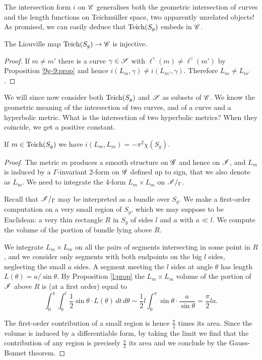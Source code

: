 The intersection form $i$ on $\mathscr{C}$ generalises both the geometric intersection of curves and the length functions on Teichm\"uller space, two apparently unrelated objects! As promised, we can easily deduce that ${\rm Teich}(S_g)$ embeds in $\mathscr{C}$.

\begin{cor}
The Liouville map ${\rm Teich}(S_g) \to \mathscr{C}$ is injective.
\end{cor}
\begin{proof}
If $m\neq m'$ there is a curve $\gamma\in\mathscr{S}$ with $\ell^\gamma(m) \neq \ell^\gamma(m')$ by Proposition \ref{9g-9:prop} and hence $i(L_m,\gamma) \neq i(L_{m'},\gamma)$. Therefore $L_m \neq L_{m'}$.
\end{proof}

We will since now consider both ${\rm Teich}(S_g)$ and $\mathscr{S}$ as subsets of $\mathscr{C}$.
We know the geometric meaning of the intersection of two curves, and of a curve and a hyperbolic metric. What is the intersection of two hyperbolic metrics? When they coincide, we get a positive constant.

\begin{prop}
If $m \in {\rm Teich}(S_g)$ we have $i(L_m, L_m) = -\pi^2 \chi(S_g)$.
\end{prop}
\begin{proof}
The metric $m$ produces a smooth structure on $\mathscr{G}$ and hence on $\mathscr{I}$, and $L_m$ is induced by a $\Gamma$-invariant 2-form on $\mathscr{G}$ defined up to sign, that we also denote as $L_m$. We need to integrate the 4-form $L_m \times L_m$ on $\mathscr{I}/_\Gamma$.

Recall that $\mathscr{I}/_\Gamma$ may be interpreted as a bundle over $S_g$.
We make a first-order computation on a very small region of $S_g$, which we may suppose to be Euclidean: a very thin rectangle $R$ in $S_g$ of sides $l$ and $a$ with $a \ll l$. We compute the volume of the portion of bundle lying above $R$.

We integrate $L_m \times L_m$ on all the pairs of segments intersecting in some point in $R$, and we consider only segments with both endpoints on the big $l$ sides, neglecting the small $a$ sides. A segment meeting the $l$ sides at angle $\theta$ has length $L(\theta) = a/\sin \theta$. By Proposition \ref{l:prop} the $L_m \times L_m$ volume of the portion of $\mathscr{I}$ above $R$ is (at a first order) equal to
$$\int_0^\pi \int_0^l \frac 12 \sin \theta \cdot L(\theta) \, dt\, d\theta \sim
\frac 12 l \int_0^\pi \sin \theta \cdot \frac a{\sin \theta} = \frac{\pi}2 la.$$

The first-order contribution of a small region is hence $\frac{\pi}2$ times its area. Since the volume is induced by a differentiable form, by taking the limit we find that the contribution of any region is precisely $\frac{\pi}2$ its area and we conclude by the Gauss-Bonnet theorem.
\end{proof}

